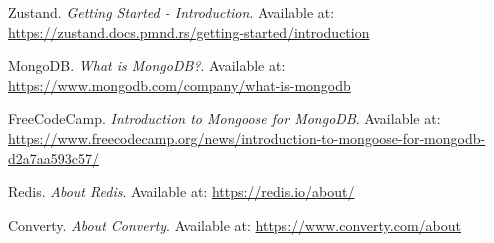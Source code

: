 \begin{thebibliography}{99}
    Zustand. \textit{Getting Started - Introduction}. Available at: \url{https://zustand.docs.pmnd.rs/getting-started/introduction}
        
    MongoDB. \textit{What is MongoDB?}. Available at: \url{https://www.mongodb.com/company/what-is-mongodb}
        
    FreeCodeCamp. \textit{Introduction to Mongoose for MongoDB}. Available at: \url{https://www.freecodecamp.org/news/introduction-to-mongoose-for-mongodb-d2a7aa593c57/}
        
    Redis. \textit{About Redis}. Available at: \url{https://redis.io/about/}

    Converty. \textit{About Converty}. Available at: \url{https://www.converty.com/about}

\end{thebibliography}